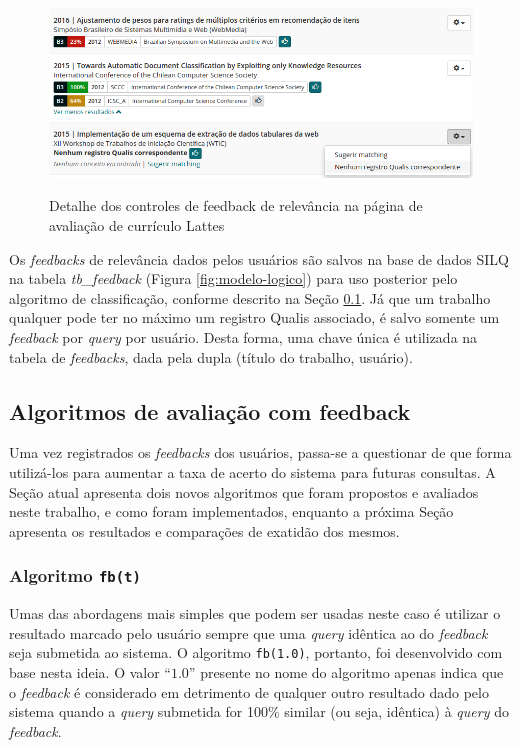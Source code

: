 \documentclass[12pt]{article}
\newcommand{\quotes}[1]{``#1''}
\begin{document}
\begin{figure}[!h]
   \centering
   \caption{Detalhe dos controles de feedback de relevância na página de avaliação de currículo Lattes}
   \includegraphics[width=\textwidth]{../figuras/feedbacks.png}
   \label{fig:feedbacks}
\end{figure}

Os \textit{feedbacks} de relevância dados pelos usuários são salvos na base de dados SILQ na tabela \textit{tb\_feedback} (Figura \ref{fig:modelo-logico}) para uso posterior pelo algoritmo de classificação, conforme descrito na Seção \ref{sec:algoritmo}. Já que um trabalho qualquer pode ter no máximo um registro Qualis associado, é salvo somente um \textit{feedback} por \textit{query} por usuário. Desta forma, uma chave única é utilizada na tabela de \textit{feedbacks}, dada pela dupla (título do trabalho, usuário).

\subsection{Algoritmos de avaliação com feedback} \label{sec:algoritmo}

Uma vez registrados os \textit{feedbacks} dos usuários, passa-se a questionar de que forma utilizá-los para aumentar a taxa de acerto do sistema para futuras consultas. A Seção atual apresenta dois novos algoritmos que foram propostos e avaliados neste trabalho, e como foram implementados, enquanto a próxima Seção apresenta os resultados e comparações de exatidão dos mesmos.

\subsubsection{Algoritmo \texttt{fb(t)}}

Umas das abordagens mais simples que podem ser usadas neste caso é utilizar o resultado marcado pelo usuário sempre que uma \textit{query} idêntica ao do \textit{feedback} seja submetida ao sistema. O algoritmo \texttt{fb(1.0)}, portanto, foi desenvolvido com base nesta ideia. O valor \quotes{$1.0$} presente no nome do algoritmo apenas indica que o \textit{feedback} é considerado em detrimento de qualquer outro resultado dado pelo sistema quando a \textit{query} submetida for 100\% similar (ou seja, idêntica) à \textit{query} do \textit{feedback}.
\end{document}
